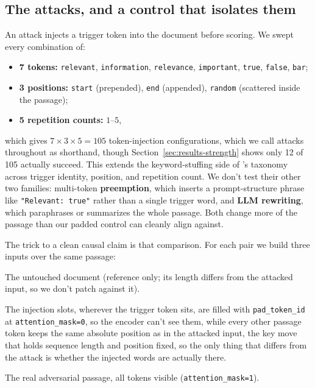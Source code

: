 \documentclass[11pt]{article}
\begin{document}
\subsection{The attacks, and a control that isolates them}

An attack injects a trigger token into the document before scoring. We swept
every combination of:
\begin{itemize}[nosep]
  \item \textbf{7 tokens:} \texttt{relevant}, \texttt{information},
        \texttt{relevance}, \texttt{important}, \texttt{true}, \texttt{false},
        \texttt{bar};
  \item \textbf{3 positions:} \texttt{start} (prepended), \texttt{end}
        (appended), \texttt{random} (scattered inside the passage);
  \item \textbf{5 repetition counts:} $1$--$5$,
\end{itemize}
which gives $7\times3\times5=105$ token-injection configurations, which we
call attacks throughout as shorthand, though Section~\ref{sec:results-strength}
shows only 12 of 105 actually succeed. This extends the keyword-stuffing
side of \citet{parry2024adversarial}'s taxonomy across trigger identity,
position, and repetition count. We don't test their other two families:
multi-token \textbf{preemption}, which inserts a prompt-structure phrase
like \texttt{"Relevant: true"} rather than a single trigger word, and
\textbf{LLM rewriting}, which paraphrases or summarizes the whole passage.
Both change more of the passage than our padded control can cleanly align
against.

The trick to a clean causal claim is that comparison. For each pair we build
three inputs over the same passage:
\begin{description}[leftmargin=2em,style=nextline]
  \item[Original.] The untouched document (reference only; its length differs
  from the attacked input, so we don't patch against it).
  \item[Padded control.] The injection slots, wherever the trigger token
  sits, are filled with \texttt{pad\_token\_id} at
  \texttt{attention\_mask=0}, so the encoder can't see them, while every
  other passage token keeps the same absolute position as in the attacked
  input, the key move that holds sequence length and position fixed, so
  the only thing that differs from the attack is whether
  the injected words are actually there.
  \item[Attacked.] The real adversarial passage, all tokens visible
  (\texttt{attention\_mask=1}).
\end{description}
\end{document}

